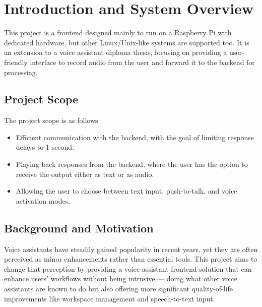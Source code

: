 \renewcommand*\chapterpagestyle{scrheadings}
\chapter{Introduction and System Overview}

This project is a frontend designed mainly to run on a Raspberry Pi with dedicated hardware, but other Linux/Unix-like systems are supported too. It is an extension to a voice assistant diploma thesis, focusing on providing a user-friendly interface to record audio from the user and forward it to the backend for processing.

\section{Project Scope}
The project scope is as follows:
\begin{itemize}
    \item Efficient communication with the backend, with the goal of limiting response delays to 1 second.
    \item Playing back responses from the backend, where the user has the option to receive the output either as text or as audio.
    \item Allowing the user to choose between text input, push-to-talk, and voice activation modes.
\end{itemize}

\section{Background and Motivation}
Voice assistants have steadily gained popularity in recent years, yet they are often perceived as minor enhancements rather than essential tools. This project aims to change that perception by providing a voice assistant frontend solution that can enhance users' workflows without being intrusive --- doing what other voice assistants are known to do but also offering more significant quality-of-life improvements like workspace management and speech-to-text input.

